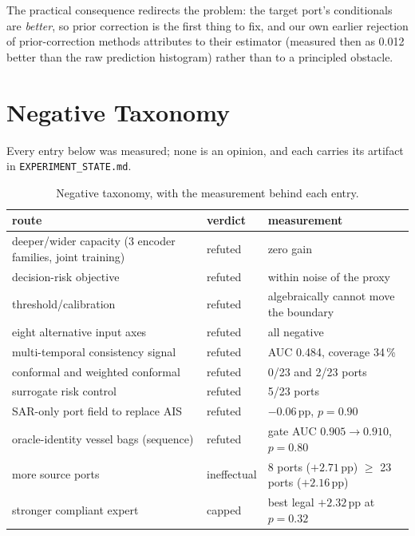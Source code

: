 \documentclass[journal]{IEEEtran}
\begin{document}
The practical consequence redirects the problem: the target port's conditionals are \emph{better}, so
prior correction \cite{saerens2002adjusting,lipton2018bbse,garg2020unified} is the first thing to fix,
and our own earlier rejection of prior-correction methods attributes to their estimator (measured then
as 0.012 better than the raw prediction histogram) rather than to a principled obstacle.

\section{Negative Taxonomy}
\label{sec:taxonomy}

Every entry below was measured; none is an opinion, and each carries its artifact in
\texttt{EXPERIMENT\_STATE.md}.

\begin{table}[t]
\caption{Negative taxonomy, with the measurement behind each entry.}
\label{tab:taxonomy}
\centering
\footnotesize
\begin{tabular}{@{}L{3.1cm}L{1.2cm}L{3.3cm}@{}}
\toprule
route & verdict & measurement \\
\midrule
deeper/wider capacity (3 encoder families, joint training) & refuted & zero gain \\
decision-risk objective & refuted & within noise of the proxy \\
threshold/calibration & refuted & algebraically cannot move the boundary \\
eight alternative input axes & refuted & all negative \\
multi-temporal consistency signal & refuted & AUC 0.484, coverage 34\,\% \\
conformal and weighted conformal \cite{tibshirani2019conformal} & refuted & 0/23 and 2/23 ports \\
surrogate risk control \cite{angelopoulos2024riskcontrol} & refuted & 5/23 ports \\
SAR-only port field to replace AIS & refuted & $-0.06$\,pp, $p = 0.90$ \\
oracle-identity vessel bags (sequence) & refuted & gate AUC $0.905 \rightarrow 0.910$, $p = 0.80$ \\
more source ports & ineffectual & 8 ports ($+2.71$\,pp) $\ge$ 23 ports ($+2.16$\,pp) \\
stronger compliant expert & capped & best legal $+2.32$\,pp at $p = 0.32$ \\
\bottomrule
\end{tabular}
\end{table}
\end{document}
